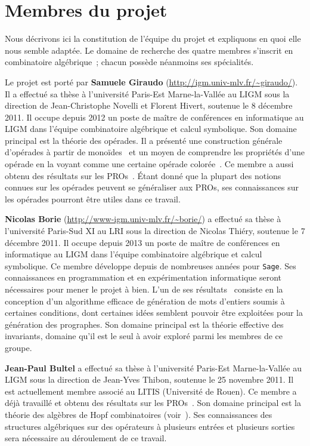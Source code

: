 \documentclass[10pt,reqno]{amsart}
\numberwithin{equation}{subsection}
\begin{document}
\section{Membres du projet}
Nous décrivons ici la constitution de l'équipe du projet et expliquons
en quoi elle nous semble adaptée. Le domaine de recherche des quatre 
membres s'inscrit en combinatoire algébrique~; chacun possède néanmoins 
ses spécialités.

Le projet est porté par {\bf Samuele Giraudo}
(\url{http://igm.univ-mlv.fr/~giraudo/}). Il a effectué sa thèse à
l'université Paris-Est Marne-la-Vallée au LIGM sous la direction de
Jean-Christophe Novelli et Florent Hivert, soutenue le 8 décembre 2011.
Il occupe depuis 2012 un poste de maître de conférences en informatique
au LIGM dans l'équipe combinatoire algébrique et calcul symbolique. Son
domaine principal est la théorie des opérades. Il a présenté
une construction générale d'opérades à partir de monoïdes~\cite{Gir15} 
et un moyen de comprendre les propriétés d'une opérade en la voyant 
comme une certaine opérade colorée~\cite{CG14}. Ce membre a aussi obtenu 
des résultats sur les PROs~\cite{BG14}. Étant donné que la plupart des 
notions connues sur les opérades peuvent se généraliser aux PROs, ses
connaissances sur les opérades pourront être utiles dans ce travail.

{\bf Nicolas Borie} (\url{http://www-igm.univ-mlv.fr/~borie/}) a effectué
sa thèse à l'université Paris-Sud XI au LRI sous la direction de Nicolas
Thiéry, soutenue le 7 décembre 2011. Il occupe depuis 2013 un poste de
maître de conférences en informatique au LIGM dans l'équipe combinatoire
algébrique et calcul symbolique. Ce membre développe depuis de nombreuses
années pour \texttt{Sage}. Ses connaissances en programmation et en
expérimentation informatique seront nécessaires pour mener le projet à
bien. L'un de ses résultats~\cite{Bor13} consiste en la conception d'un
algorithme efficace de génération de mots d'entiers soumis à certaines
conditions, dont certaines idées semblent pouvoir être exploitées pour
la génération des prographes. Son domaine principal est la théorie
effective des invariants, domaine qu'il est le seul à avoir exploré
parmi les membres de ce groupe.

{\bf Jean-Paul Bultel} a effectué sa thèse à l'université Paris-Est
Marne-la-Vallée au LIGM sous la direction de Jean-Yves Thibon, soutenue
le 25 novembre 2011. Il est actuellement membre associé au LITIS 
(Université de Rouen). Ce membre a déjà travaillé et obtenu des
résultats sur les PROs~\cite{BG14}. Son domaine principal est la théorie
des algèbres de Hopf combinatoires (voir~\cite{Bul11}). Ses connaissances
des structures algébriques sur des opérateurs à plusieurs entrées et
plusieurs sorties sera nécessaire au déroulement de ce travail.
\end{document}
